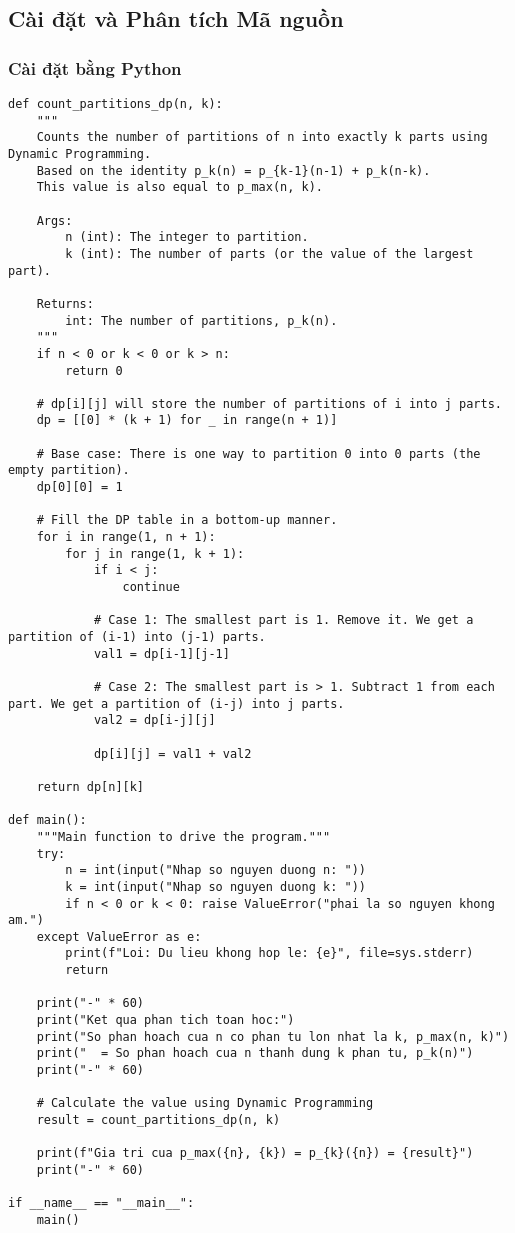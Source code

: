 \documentclass[a4paper,12pt]{article}
\begin{document}
\subsection{Cài đặt và Phân tích Mã nguồn}
\subsubsection{Cài đặt bằng Python}
\begin{lstlisting}[style=pythonstyle, caption={Counting partitions using Dynamic Programming in Python.}, label={lst:python_count}]
def count_partitions_dp(n, k):
    """
    Counts the number of partitions of n into exactly k parts using Dynamic Programming.
    Based on the identity p_k(n) = p_{k-1}(n-1) + p_k(n-k).
    This value is also equal to p_max(n, k).

    Args:
        n (int): The integer to partition.
        k (int): The number of parts (or the value of the largest part).

    Returns:
        int: The number of partitions, p_k(n).
    """
    if n < 0 or k < 0 or k > n:
        return 0

    # dp[i][j] will store the number of partitions of i into j parts.
    dp = [[0] * (k + 1) for _ in range(n + 1)]
    
    # Base case: There is one way to partition 0 into 0 parts (the empty partition).
    dp[0][0] = 1

    # Fill the DP table in a bottom-up manner.
    for i in range(1, n + 1):
        for j in range(1, k + 1):
            if i < j:
                continue
            
            # Case 1: The smallest part is 1. Remove it. We get a partition of (i-1) into (j-1) parts.
            val1 = dp[i-1][j-1]
            
            # Case 2: The smallest part is > 1. Subtract 1 from each part. We get a partition of (i-j) into j parts.
            val2 = dp[i-j][j]
            
            dp[i][j] = val1 + val2
            
    return dp[n][k]

def main():
    """Main function to drive the program."""
    try:
        n = int(input("Nhap so nguyen duong n: "))
        k = int(input("Nhap so nguyen duong k: "))
        if n < 0 or k < 0: raise ValueError("phai la so nguyen khong am.")
    except ValueError as e:
        print(f"Loi: Du lieu khong hop le: {e}", file=sys.stderr)
        return

    print("-" * 60)
    print("Ket qua phan tich toan hoc:")
    print("So phan hoach cua n co phan tu lon nhat la k, p_max(n, k)")
    print("  = So phan hoach cua n thanh dung k phan tu, p_k(n)")
    print("-" * 60)

    # Calculate the value using Dynamic Programming
    result = count_partitions_dp(n, k)
    
    print(f"Gia tri cua p_max({n}, {k}) = p_{k}({n}) = {result}")
    print("-" * 60)

if __name__ == "__main__":
    main()
\end{lstlisting}
\end{document}
